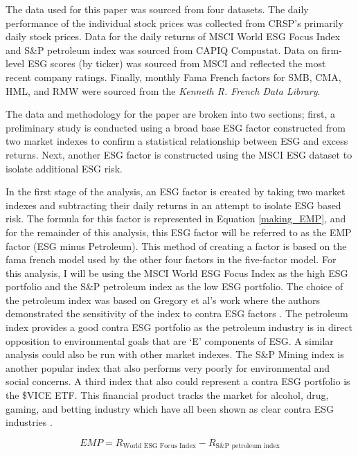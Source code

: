 The data used for this paper was sourced from four datasets. The daily performance of the individual stock prices was collected from CRSP's primarily daily stock prices. Data for the daily returns of MSCI World ESG Focus Index and S\&P petroleum index was sourced from CAPIQ Compustat. Data on firm-level ESG scores (by ticker) was sourced from MSCI and reflected the most recent company ratings. Finally, monthly Fama French factors for SMB, CMA, HML, and RMW were sourced from the \textit{Kenneth R. French Data Library}.  


The data and methodology for the paper are broken into two sections; first, a preliminary study is conducted using a broad base ESG factor constructed from two market indexes to confirm a statistical relationship between ESG and excess returns. Next, another ESG factor is constructed using the MSCI ESG dataset  to isolate additional ESG risk.

In the first stage of the analysis, an ESG factor is created by taking two market indexes and subtracting their daily returns in an attempt to isolate ESG based risk. The formula for this factor is represented in Equation \eqref{making_EMP}, and for the remainder of this analysis, this ESG factor will be referred to as the EMP factor (ESG minus Petroleum). This method of creating a factor is based on the fama french model used by the other four factors in the five-factor model. For this analysis, I will be using the MSCI World ESG Focus Index as the high ESG portfolio and the  S\&P petroleum index as the low ESG portfolio. The choice of the petroleum index was based on Gregory et al's work where the authors demonstrated the sensitivity of the index to contra ESG factors \cite{Frynas2005TheFD}. The petroleum index provides a good contra ESG portfolio as the petroleum industry is in direct opposition to environmental goals that are `E' components of ESG. A similar analysis could also be run with other market indexes. The S\&P Mining index is another popular index that also performs very poorly for environmental and social concerns\cite{Kapelus2002MiningCS}. A third index that also could represent a contra ESG portfolio is the  \$VICE ETF. This financial product tracks the market for alcohol, drug, gaming, and betting industry which have all been shown as clear contra ESG industries \cite{Grougiou2016CorporateSR}.

\begin{equation}
    \label{making_EMP}
    EMP = R_{\text{World ESG Focus Index}}- R_{\text{S\&P petroleum index}}
\end{equation}


